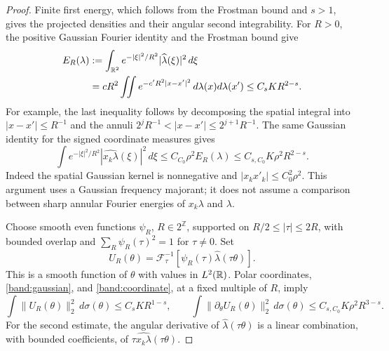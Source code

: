 \begin{proof}
Finite first energy, which follows from the Frostman bound and \(s>1\),
gives the projected densities and their angular second integrability.
For \(R>0\), the positive Gaussian Fourier identity and the Frostman
bound give
\begin{equation}\label{band:gaussian}
\begin{aligned}
E_R(\lambda)&:=\int_{\mathbb R^2}e^{-|\xi|^2/R^2}
                   |\widehat\lambda(\xi)|^2\,d\xi\\
&=cR^2\iint e^{-c'R^2|x-x'|^2}\,d\lambda(x)d\lambda(x')
\leq C_sKR^{2-s}.
\end{aligned}
\end{equation}
For example, the last inequality follows by decomposing the spatial
integral into \(|x-x'|\leq R^{-1}\) and the annuli
\(2^jR^{-1}<|x-x'|\leq2^{j+1}R^{-1}\).
The same Gaussian identity for the signed coordinate measures gives
\begin{equation}\label{band:coordinate}
\int e^{-|\xi|^2/R^2}|\widehat{x_k\lambda}(\xi)|^2\,d\xi
\leq C_{C_0}\rho^2 E_R(\lambda)
\leq C_{s,C_0}K\rho^2R^{2-s}.
\end{equation}
Indeed the spatial Gaussian kernel is nonnegative and
\(|x_kx'_k|\leq C_0^2\rho^2\). This argument uses a Gaussian frequency
majorant; it does not assume a comparison between sharp annular
Fourier energies of \(x_k\lambda\) and \(\lambda\).

Choose smooth even functions \(\psi_R\), \(R\in2^{\mathbb Z}\),
supported on \(R/2\leq|\tau|\leq2R\), with bounded overlap and
\(\sum_R\psi_R(\tau)^2=1\) for \(\tau\ne0\). Set
$$
U_R(\theta)=\mathcal F^{-1}_\tau
                 [\psi_R(\tau)\widehat\lambda(\tau\theta)].
$$
This is a smooth function of \(\theta\) with values in \(L^2(\mathbb R)\).
Polar coordinates, \eqref{band:gaussian}, and
\eqref{band:coordinate}, at a fixed multiple of \(R\), imply
\begin{equation}\label{band:two-estimates}
\int\|U_R(\theta)\|_2^2\,d\sigma(\theta)\leq C_sKR^{1-s},
\qquad
\int\|\partial_\theta U_R(\theta)\|_2^2\,d\sigma(\theta)
\leq C_{s,C_0}K\rho^2R^{3-s}.
\end{equation}
For the second estimate, the angular derivative of
\(\widehat\lambda(\tau\theta)\) is a linear combination, with bounded
coefficients, of \(\tau\widehat{x_k\lambda}(\tau\theta)\).


\end{proof}
